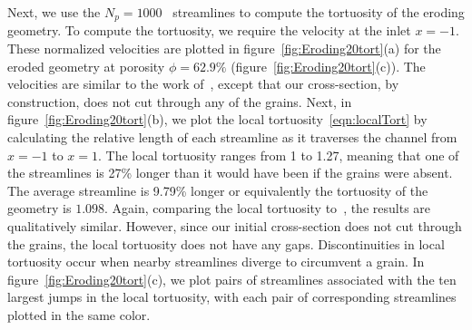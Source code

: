 \documentclass{jfm}
\begin{document}
Next, we use the $N_p = 1000$~\citep{bel-sal-rin1992} streamlines to
compute the tortuosity of the eroding geometry.  To compute the
tortuosity, we require the velocity at the inlet $x=-1$.  These
normalized velocities are plotted in figure~\ref{fig:Eroding20tort}(a)
for the eroded geometry at porosity $\phi = 62.9\%$
(figure~\ref{fig:Eroding20tort}(c)).  The velocities are similar to the
work of~\citet[see figure 4(a)]{mat-kha-koz2008}, except that our
cross-section, by construction, does not cut through any of the grains.
Next, in figure~\ref{fig:Eroding20tort}(b), we plot the local
tortuosity~\eqref{eqn:localTort} by calculating the relative length of
each streamline as it traverses the channel from $x=-1$ to $x=1$.  The
local tortuosity ranges from 1 to 1.27, meaning that one of the
streamlines is 27\% longer than it would have been if the grains were
absent.  The average streamline is 9.79\% longer or equivalently the
tortuosity of the geometry is $1.098$.  Again, comparing the local
tortuosity to~\citet[see figure 4(b)]{mat-kha-koz2008}, the results are
qualitatively similar. However, since our initial cross-section does not
cut through the grains, the local tortuosity does not have any gaps.
Discontinuities in local tortuosity occur when nearby streamlines
diverge to circumvent a grain.  In figure~\ref{fig:Eroding20tort}(c), we
plot pairs of streamlines associated with the ten largest jumps in the
local tortuosity, with each pair of corresponding streamlines plotted in
the same color.
\end{document}
